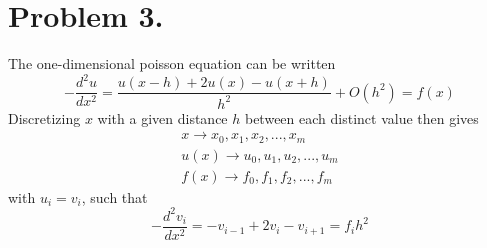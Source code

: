\documentclass[english,notitlepage]{revtex4-1}  %
\begin{document}
\section*{Problem 3.}
    The one-dimensional poisson equation can be written
    \begin{equation*}
            -\frac{d ^2 u}{dx^2} 
        =   \frac{u(x-h)+2u(x)- u(x+h)}{h^2} + O(h^2)
        =   f(x)
    \end{equation*}
    Discretizing $x$ with a given distance $h$ between each distinct value then gives
    \begin{align*}
            x 
        \rightarrow 
            x_0, x_1, x_2, ..., x_m\\
            u(x) 
        \rightarrow 
            u_0, u_1, u_2, ..., u_m\\
            f(x) 
        \rightarrow 
            f_0, f_1 , f_2, ..., f_m
    \end{align*}
    with $u_i = v_i$, such that
    \begin{equation*}
            -\frac{d^2 v_i}{dx^2} 
        =   -v_{i-1} + 2v_i - v_{i+1} 
        =   f_ih^2
    \end{equation*}
\end{document}
